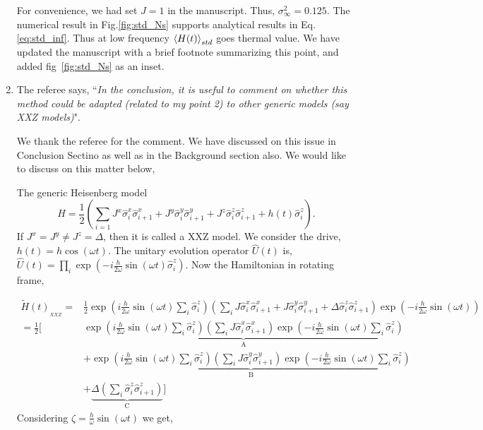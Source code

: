 \documentclass[aps,prb,reprint,showpacs,floatfix,superscriptaddress, onecolumn, nofootinbib, 9pt]{revtex4-2}
\newcommand{\response}[1]{{\color{black}#1}} %
\newcommand{\comment}[1]{{\color{blue}#1}} %
\begin{document}
\begin{enumerate}
{			For convenience, we had set $J=1$ in the manuscript. Thus, $\sigma_\infty^2 = 0.125$. The numerical result in Fig.\ref{fig:std_Ns} supports analytical results in Eq. \eqref{eq:std_inf}. Thus at low frequency $\expval{H(t)}_{std}$ goes thermal value. We have updated the manuscript with a brief footnote summarizing this point, and added fig~\ref{fig:std_Ns} as an inset.
		}
		
		
		\vskip 2cm
		\item The referee says, \comment{``\textit{In the conclusion, it is useful to comment on whether this method could be adapted (related to my point 2) to other generic models (say XXZ models)}"}.\\
		
		\response{
		We thank the referee for the comment. We have discussed on this issue in Conclusion Sectino as well as in the Background section also.
		We would like to discuss on this matter below, 

		The generic Heisenberg model
		\begin{equation*}
			H = \frac12 \left( \sum_{i=1} J^x \hat{\sigma}^x_i \hat{\sigma}^x_{i+1} +J^y  \hat{\sigma}^y_i \hat{\sigma}^y_{i+1} + J^z  \hat{\sigma}^z_i \hat{\sigma}^z_{i+1} + h(t)  \hat{\sigma}^z_i\right).
		\end{equation*}
		If $J^x= J^y \neq J^z=\Delta$, then it is called a XXZ model. We consider the drive, $h(t) = h \cos(\omega t)$. The unitary evolution operator $\displaystyle \hat{U}(t)$ is, $\hat{U}(t)=\prod_{i} \exp \left(-i \frac{h}{2 \omega} \sin (\omega t) \hat{\sigma}_{i}^{z}\right)$. Now the Hamiltonian in rotating frame,
		
		\begin{align}
			\tilde{H}(t)_{_{XXZ}}= & \frac{1}{2} \exp \left(i \frac{h}{2 \omega} \sin (\omega t) \sum_{i} \hat{\sigma}_{i}^{z}\right)\left(\sum_{i} J \hat{\sigma}^x_i \hat{\sigma}^x_{i+1} + J \hat{\sigma}^y_i \hat{\sigma}^y_{i+1}+ \Delta  \hat{\sigma}^z_i \hat{\sigma}^z_{i+1}\right) \exp \left(-i \frac{h}{2 \omega} \sin (\omega t)\right)\nonumber\\
			= \frac12 \Bigg[& \underbrace{\exp \left(i \frac{h}{2 \omega} \sin (\omega t) \sum_{i} \hat{\sigma}_{i}^{z}\right)\left(\sum_{i} J \hat{\sigma}_{i}^{x} \hat{\sigma}_{i+1}^{x}\right) \exp \left(-i \frac{h}{2 \omega} \sin (\omega t) \sum_i\hat{\sigma}_{i}^{z}\right)}_{\mathrm{A}} \nonumber\\
			& +\underbrace{\exp \left(i \frac{h}{2 \omega} \sin (\omega t) \sum_{i} \hat{\sigma}_{i}^{z}\right)\left(\sum_{i} J \hat{\sigma}_{i}^{y} \hat{\sigma}_{i+1}^{y}\right) \exp \left(-i \frac{h}{2 \omega} \sin (\omega t) \sum_i\hat{\sigma}_{i}^{z}\right)}_{\mathrm{B}} \nonumber\\
			& +\underbrace{\Delta \left(\sum_{i}  \hat{\sigma}_{i}^{z} \hat{\sigma}_{i+1}^{z}\right)}_{\mathrm{C}}\Bigg]
			\label{eq:xxz1}
		\end{align}
	Considering $\zeta = \frac{h}{\omega}\sin(\omega t)$ we get,

}
\end{enumerate}
\end{document}
